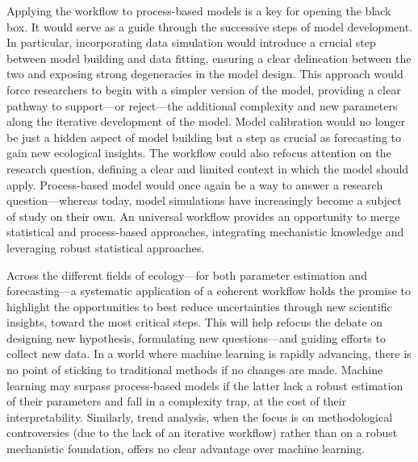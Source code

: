 \documentclass[11pt]{article}
\begin{document}
Applying the workflow to process-based models is a key for opening the black box. It would serve as a guide through the successive steps of model development. In particular, incorporating data simulation would introduce a crucial step between model building and data fitting, ensuring a clear delineation between the two and exposing strong degeneracies in the model design. This approach would force researchers to begin with a simpler version of the model, providing a clear pathway to support---or reject---the additional complexity and new parameters along the iterative development of the model. 
Model calibration would no longer be just a hidden aspect of model building but a step as crucial as forecasting to gain new ecological insights. 
The workflow could also refocus attention on the research question, defining a clear and limited context in which the model should apply.
Process-based model would once again be a way to answer a research question---whereas today, model simulations have increasingly become a subject of study on their own. An universal workflow provides an opportunity to merge statistical and process-based approaches, integrating mechanistic knowledge and leveraging robust statistical approaches. 

Across the different fields of ecology---for both parameter estimation and forecasting---a systematic application of a coherent workflow holds the promise to highlight the opportunities to best reduce uncertainties through new scientific insights, toward the most critical steps. This will help refocus the debate on designing new hypothesis, formulating new questions---and guiding efforts to collect new data. 
In a world where machine learning is rapidly advancing, there is no point of sticking to traditional methods if no changes are made. Machine learning may surpass process-based models if the latter lack a robust estimation of their parameters and fall in a complexity trap, at the cost of their interpretability. Similarly, trend analysis, when the focus is on methodological controversies (due to the lack of an iterative workflow) rather than on a robust mechanistic foundation, offers no clear advantage over machine learning.
\end{document}
